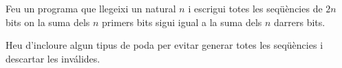 

\UsePython

\Statement

Feu un programa que llegeixi un natural $n$ i escrigui totes les seqüències de $2n$ bits on la suma dels $n$ primers bits sigui igual a la suma dels $n$ darrers bits. 

\medskip

Heu d'incloure algun tipus de poda per evitar generar totes les seqüències i descartar les inválides.

\ObservationElastic

\Sample
